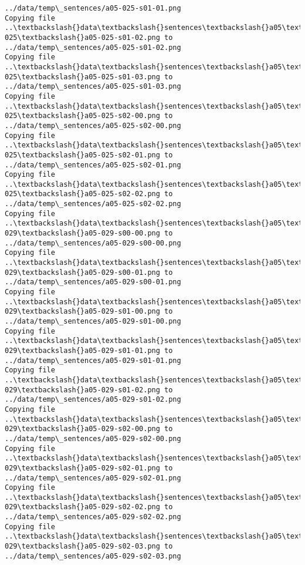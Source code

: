 \documentclass[11pt]{article}
\begin{document}
\begin{Verbatim}[commandchars=\\\{\}]
../data/temp\_sentences/a05-025-s01-01.png
Copying file ..\textbackslash{}data\textbackslash{}sentences\textbackslash{}a05\textbackslash{}a05-025\textbackslash{}a05-025-s01-02.png to
../data/temp\_sentences/a05-025-s01-02.png
Copying file ..\textbackslash{}data\textbackslash{}sentences\textbackslash{}a05\textbackslash{}a05-025\textbackslash{}a05-025-s01-03.png to
../data/temp\_sentences/a05-025-s01-03.png
Copying file ..\textbackslash{}data\textbackslash{}sentences\textbackslash{}a05\textbackslash{}a05-025\textbackslash{}a05-025-s02-00.png to
../data/temp\_sentences/a05-025-s02-00.png
Copying file ..\textbackslash{}data\textbackslash{}sentences\textbackslash{}a05\textbackslash{}a05-025\textbackslash{}a05-025-s02-01.png to
../data/temp\_sentences/a05-025-s02-01.png
Copying file ..\textbackslash{}data\textbackslash{}sentences\textbackslash{}a05\textbackslash{}a05-025\textbackslash{}a05-025-s02-02.png to
../data/temp\_sentences/a05-025-s02-02.png
Copying file ..\textbackslash{}data\textbackslash{}sentences\textbackslash{}a05\textbackslash{}a05-029\textbackslash{}a05-029-s00-00.png to
../data/temp\_sentences/a05-029-s00-00.png
Copying file ..\textbackslash{}data\textbackslash{}sentences\textbackslash{}a05\textbackslash{}a05-029\textbackslash{}a05-029-s00-01.png to
../data/temp\_sentences/a05-029-s00-01.png
Copying file ..\textbackslash{}data\textbackslash{}sentences\textbackslash{}a05\textbackslash{}a05-029\textbackslash{}a05-029-s01-00.png to
../data/temp\_sentences/a05-029-s01-00.png
Copying file ..\textbackslash{}data\textbackslash{}sentences\textbackslash{}a05\textbackslash{}a05-029\textbackslash{}a05-029-s01-01.png to
../data/temp\_sentences/a05-029-s01-01.png
Copying file ..\textbackslash{}data\textbackslash{}sentences\textbackslash{}a05\textbackslash{}a05-029\textbackslash{}a05-029-s01-02.png to
../data/temp\_sentences/a05-029-s01-02.png
Copying file ..\textbackslash{}data\textbackslash{}sentences\textbackslash{}a05\textbackslash{}a05-029\textbackslash{}a05-029-s02-00.png to
../data/temp\_sentences/a05-029-s02-00.png
Copying file ..\textbackslash{}data\textbackslash{}sentences\textbackslash{}a05\textbackslash{}a05-029\textbackslash{}a05-029-s02-01.png to
../data/temp\_sentences/a05-029-s02-01.png
Copying file ..\textbackslash{}data\textbackslash{}sentences\textbackslash{}a05\textbackslash{}a05-029\textbackslash{}a05-029-s02-02.png to
../data/temp\_sentences/a05-029-s02-02.png
Copying file ..\textbackslash{}data\textbackslash{}sentences\textbackslash{}a05\textbackslash{}a05-029\textbackslash{}a05-029-s02-03.png to
../data/temp\_sentences/a05-029-s02-03.png

\end{Verbatim}
\end{document}
